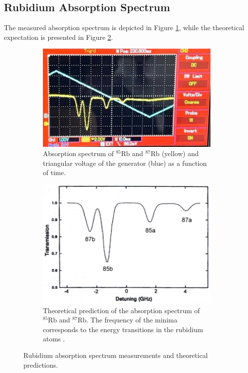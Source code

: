 \subsection{Rubidium Absorption Spectrum}
The measured absorption spectrum is depicted in Figure \ref{fig:spectrum_1}, 
while the theoretical expectation is presented in Figure \ref{fig:spectrum_2}.
\begin{figure}
    \centering
    \begin{subfigure}{0.45\textwidth}
      \centering
      \includegraphics[width=\textwidth]{pictures/Spektrum.jpeg}
      \caption{Absorption spectrum of $^{85}\text{Rb}$ and $^{87}\text{Rb}$ (yellow) and triangular voltage of the generator (blue) as a function of time.}
      \label{fig:spectrum_1}
    \end{subfigure}
    \hfill
    \begin{subfigure}{0.45\textwidth}
      \centering
      \includegraphics[width=\textwidth]{pictures/Theoriespektrum.png}
      \caption{Theoretical prediction of the absorption spectrum of $^{85}\text{Rb}$ and $^{87}\text{Rb}$. The frequency of the minima corresponds to the energy transitions in the rubidium atoms \cite{satabs1}.}
      \label{fig:spectrum_2}
    \end{subfigure}
    \caption{Rubidium absorption spectrum measurements and theoretical predictions.}
    \label{fig:spectrum}
\end{figure}
